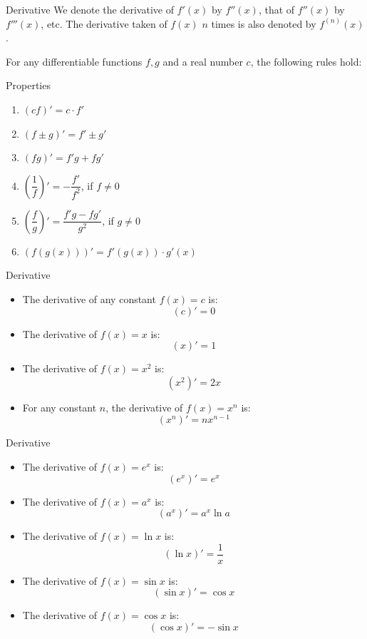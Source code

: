 \documentclass{beamer}
\begin{document}
\begin{frame}{Derivative}
We denote the derivative of $f'(x)$ by $f''(x)$, that of $f''(x)$ by $f'''(x)$, etc. The derivative taken of $f(x)$ $n$ times is also denoted by $f^{(n)}(x)$.\pause

For any differentiable functions $f, g$ and a real number $c$, the following rules hold:
    \begin{block}{Properties}
\begin{enumerate}[<+->]
    \item    $(cf)'=c\cdot f'$
    \item    $(f \pm g)'=f'\pm g'$
    \item    $(fg)'=f'g+fg'$
    \item    $\left(\dfrac{1}{f}\right)'=-\dfrac{f'}{f^2}$, if $f\ne 0$
    \item    $\left(\dfrac{f}{g}\right)'=\dfrac{f'g-fg'}{g^2}$, if $g\ne 0$
    \item    $(f(g(x)))'=f'(g(x)) \cdot g'(x)$
\end{enumerate} 
\end{block}
\end{frame}


\begin{frame}{Derivative}
     \begin{itemize}[<+->]
         \item The derivative of any constant $f(x)=c$ is:
         \[(c)' = 0\]
         \item The derivative of $f(x)=x$ is:
         \[(x)' = 1\]
         \item The derivative of $f(x)=x^2$ is:
         \[(x^2)' = 2x\]
         \item For any constant $n$, the derivative of $f(x)=x^n$ is:
         \[(x^n)' = nx^{n-1}\]
     \end{itemize}
\end{frame}

\begin{frame}{Derivative}
     \begin{itemize}[<+->]
         \item The derivative of $f(x)=e^x$ is:
         \[(e^x)' = e^x\]
         \item The derivative of $f(x)=a^x$ is:
         \[(a^x)' = a^x\ln a\]
         \item The derivative of $f(x)=\ln x$ is:
         \[(\ln x)' = \dfrac{1}{x}\]
         \item The derivative of $f(x)=\sin x$ is:
         \[(\sin x)'=\cos x\]
         \item The derivative of $f(x)=\cos x$ is:
         \[(\cos x)'=-\sin x\]
     \end{itemize}
\end{frame}
\end{document}
